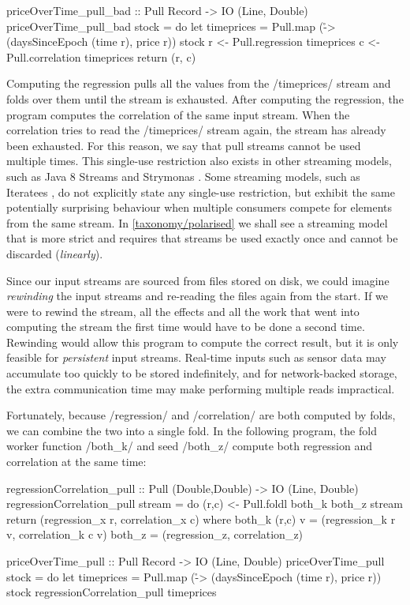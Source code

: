 \begin{haskell}
priceOverTime_pull_bad :: Pull Record -> IO (Line, Double)
priceOverTime_pull_bad stock = do
  let timeprices = Pull.map (\r -> (daysSinceEpoch (time r), price r)) stock
  r <- Pull.regression  timeprices
  c <- Pull.correlation timeprices
  return (r, c)
\end{haskell}

Computing the regression pulls all the values from the \Hs/timeprices/ stream and folds over them until the stream is exhausted.
After computing the regression, the program computes the correlation of the same input stream.
When the correlation tries to read the \Hs/timeprices/ stream again, the stream has already been exhausted.
For this reason, we say that pull streams cannot be used multiple times.
This single-use restriction also exists in other streaming models, such as Java 8 Streams \citep{reese2014java} and Strymonas \citep{biboudis2017expressive}.
Some streaming models, such as Iteratees \citep{kiselyov2012iteratees}, do not explicitly state any single-use restriction, but exhibit the same potentially surprising behaviour when multiple consumers compete for elements from the same stream.
In \cref{taxonomy/polarised} we shall see a streaming model that is more strict and requires that streams be used exactly once and cannot be discarded (\emph{linearly}).

Since our input streams are sourced from files stored on disk, we could imagine \emph{rewinding} the input streams and re-reading the files again from the start.
If we were to rewind the stream, all the effects and all the work that went into computing the stream the first time would have to be done a second time.
Rewinding would allow this program to compute the correct result, but it is only feasible for \emph{persistent} input streams.
Real-time inputs such as sensor data may accumulate too quickly to be stored indefinitely, and for network-backed storage, the extra communication time may make performing multiple reads impractical.

Fortunately, because \Hs/regression/ and \Hs/correlation/ are both computed by folds, we can combine the two into a single fold.
In the following program, the fold worker function \Hs/both_k/ and seed \Hs/both_z/ compute both regression and correlation at the same time:

\begin{haskell}
regressionCorrelation_pull :: Pull (Double,Double) -> IO (Line, Double)
regressionCorrelation_pull stream = do
  (r,c) <- Pull.foldl both_k both_z stream
  return (regression_x r, correlation_x c)
 where
  both_k (r,c) v = (regression_k r v, correlation_k c v)
  both_z         = (regression_z,     correlation_z)

priceOverTime_pull :: Pull Record -> IO (Line, Double)
priceOverTime_pull stock = do
  let timeprices = Pull.map (\r -> (daysSinceEpoch (time r), price r)) stock
  regressionCorrelation_pull timeprices
\end{haskell}

